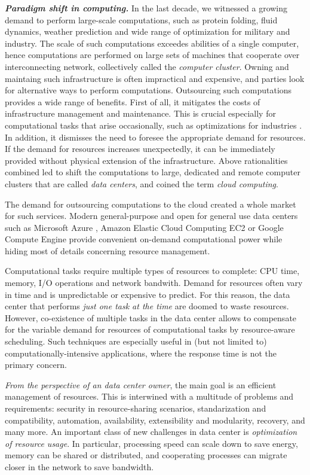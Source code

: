 \indent\textbf{\emph{Paradigm shift in computing.}}
In the last decade, we witnessed a growing demand to perform large-scale
computations, such as protein folding, fluid dynamics, weather prediction and
wide range of optimization for military and industry.
The scale of such computations exceedes abilities of a single computer, hence computations are performed on large sets of machines that cooperate over interconnecting network, collectively called the \emph{computer cluster}.
Owning and maintaing such infrastructure is often impractical and expensive, and parties look for alternative ways to perform computations.
Outsourcing such computations provides a wide range of benefits.
First of all, it mitigates the costs of infrastructure management and maintenance.
This is crucial especially for computational tasks that arise occasionally, such as optimizations for industries .
In addition, it dismisses the need to foresee the appropriate demand for resources.
If the demand for resources increases unexpectedly, it can be immediately provided without physical extension of the infrastructure.
Above rationalities combined led to shift the computations to large, dedicated and remote computer clusters that are called \emph{data centers}, and coined the term \emph{cloud computing}.

The demand for outsourcing computations to the cloud created a whole market for such services.
Modern general-purpose and open for general use data centers such as Microsoft Azure \cite{url-azure}, Amazon Elastic Cloud Computing EC2 \cite{url-amazon-ec2} or Google Compute Engine \cite{url-gce} provide convenient on-demand computational power while hiding most of details concerning resource management.

Computational tasks require multiple types of resources to complete: CPU time, memory, I/O operations and network bandwith.
Demand for resources often vary in time and is unpredictable or expensive to predict.
For this reason, the data center that performs \emph{just one task at the time} are doomed to waste resources.
However, co-existence of multiple tasks in the data center allows to compensate for the variable demand for resources of computational tasks by resource-aware scheduling.
Such techniques are especially useful in (but not limited to) computationally-intensive applications, where the response time is not the primary concern.

\emph{From the perspective of an data center owner}, the main goal 
is an efficient management of resources. This is interwined with 
a multitude of problems and requirements: security in resource-sharing scenarios,
standarization and compatibility, automation, availability, extensibility and
modularity, recovery, and many more. An important class of new challenges in
data center is \emph{optimization of resource usage}. In particular, 
processing speed can
scale down to save energy, memory can be shared or distributed, and cooperating
processes can migrate closer in the network to save bandwidth.


